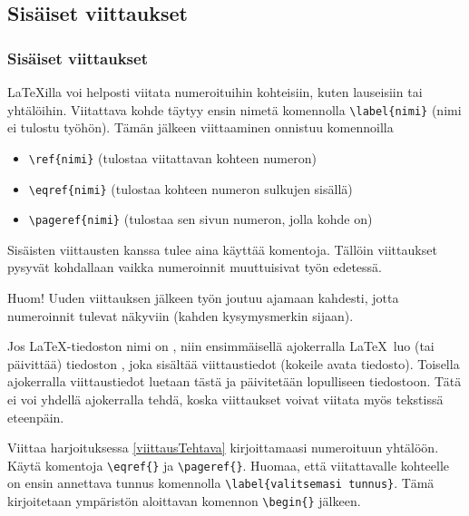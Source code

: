 \subsection{Sisäiset viittaukset}
\begin{fframe}
    \frametitle{Sisäiset viittaukset}
    \LaTeX illa voi helposti viitata numeroituihin kohteisiin, kuten lauseisiin tai yhtälöihin. Viitattava kohde täytyy ensin nimetä komennolla \lstinline-\label{nimi}- (nimi ei tulostu työhön). Tämän jälkeen viittaaminen onnistuu komennoilla 
    \begin{itemize}
        \item \lstinline-\ref{nimi}- (tulostaa viitattavan kohteen numeron)
        \item \lstinline-\eqref{nimi}- (tulostaa kohteen numeron sulkujen sisällä)
        \item \lstinline-\pageref{nimi}- (tulostaa sen sivun numeron, jolla kohde on)  
    \end{itemize}
    Sisäisten viittausten kanssa tulee aina käyttää komentoja. Tällöin viittaukset pysyvät kohdallaan vaikka numeroinnit muuttuisivat työn edetessä.
\end{fframe}

\begin{fframe}
    Huom! Uuden viittauksen jälkeen työn joutuu ajamaan kahdesti, jotta numeroinnit tulevat näkyviin (kahden kysymysmerkin sijaan).
    \begin{extra}
        Jos \LaTeX-tiedoston nimi on , niin ensimmäisellä ajokerralla \LaTeX\ luo (tai päivittää) tiedoston , joka sisältää viittaustiedot (kokeile avata tiedosto). Toisella ajokerralla viittaustiedot luetaan tästä ja päivitetään lopulliseen tiedostoon. Tätä ei voi yhdellä ajokerralla tehdä, koska viittaukset voivat viitata myös tekstissä eteenpäin.
    \end{extra}
    \begin{harj}
        Viittaa harjoituksessa \ref{viittausTehtava} kirjoittamaasi numeroituun yhtälöön. Käytä komentoja \lstinline-\eqref{}- ja \lstinline-\pageref{}-.
        \vaihto
        Huomaa, että viitattavalle kohteelle on ensin annettava tunnus komennolla \lstinline-\label{valitsemasi tunnus}-. Tämä kirjoitetaan ympäristön aloittavan komennon \lstinline-\begin{}- jälkeen. 
    \end{harj}
\end{fframe}


